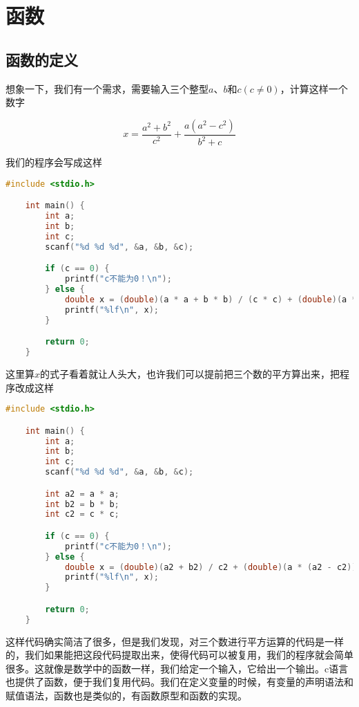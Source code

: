 \section{函数}

\subsection{函数的定义}

想象一下，我们有一个需求，需要输入三个整型$a$、$b$和$c(c\neq{}0)$，计算这样一个数字

$$
x = \frac{a^2 + b^2}{c^2} + \frac{a(a^2 - c^2)}{b^2 + c}
$$

我们的程序会写成这样

\begin{lstlisting}[language=C]
    #include <stdio.h>

    int main() {
        int a;
        int b;
        int c;
        scanf("%d %d %d", &a, &b, &c);

        if (c == 0) {
            printf("c不能为0！\n");
        } else {
            double x = (double)(a * a + b * b) / (c * c) + (double)(a * (a * a - c * c)) / (b * b + c);
            printf("%lf\n", x);
        }

        return 0;
    }
\end{lstlisting}

这里算$x$的式子看着就让人头大，也许我们可以提前把三个数的平方算出来，把程序改成这样

\begin{lstlisting}[language=C]
    #include <stdio.h>

    int main() {
        int a;
        int b;
        int c;
        scanf("%d %d %d", &a, &b, &c);

        int a2 = a * a;
        int b2 = b * b;
        int c2 = c * c;

        if (c == 0) {
            printf("c不能为0！\n");
        } else {
            double x = (double)(a2 + b2) / c2 + (double)(a * (a2 - c2)) / (b2 + c);
            printf("%lf\n", x);
        }

        return 0;
    }
\end{lstlisting}

这样代码确实简洁了很多，但是我们发现，对三个数进行平方运算的代码是一样的，我们如果能把这段代码提取出来，使得代码可以被复用，我们的程序就会简单很多。这就像是数学中的函数一样，我们给定一个输入，它给出一个输出。c语言也提供了函数，便于我们复用代码。我们在定义变量的时候，有变量的声明语法和赋值语法，函数也是类似的，有函数原型和函数的实现。

